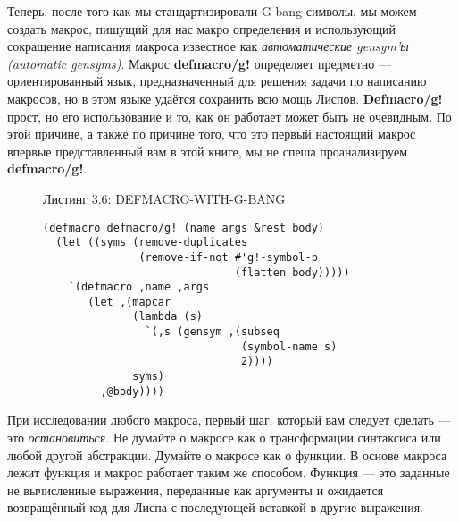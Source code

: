 Теперь, после того как мы стандартизировали G-bang символы, мы можем создать макрос, пишущий для нас макро определения и использующий сокращение написания макроса известное как \emph{автоматические gensym'ы ({automatic gensyms})}. Макрос \textbf{defmacro/g!} определяет предметно --- ориентированный язык, предназначенный для решения задачи по написанию макросов, но в этом языке удаётся сохранить всю мощь Лиспов. \textbf{Defmacro/g!} прост, но его использование и то, как он работает может быть не очевидным. По этой причине, а также по причине того, что это первый настоящий макрос впервые представленный вам в этой книге, мы не спеша проанализируем \textbf{defmacro/g!}.

\begin{figure}Листинг 3.6: DEFMACRO-WITH-G-BANG\label{listing_3.6}
\listbegin
\begin{verbatim}
(defmacro defmacro/g! (name args &rest body)
  (let ((syms (remove-duplicates
               (remove-if-not #'g!-symbol-p
                              (flatten body)))))
    `(defmacro ,name ,args
       (let ,(mapcar
              (lambda (s)
                `(,s (gensym ,(subseq
                               (symbol-name s)
                               2))))
              syms)
         ,@body))))
\end{verbatim}
\listend
\end{figure}

При исследовании любого макроса, первый шаг, который вам следует сделать --- это \emph{остановиться}. Не думайте о макросе как о трансформации синтаксиса или любой другой абстракции. Думайте о макросе как о функции. В основе макроса лежит функция и макрос работает таким же способом. Функция --- это заданные не вычисленные выражения, переданные как аргументы и ожидается возвращённый код для Лиспа с последующей вставкой в другие выражения.

